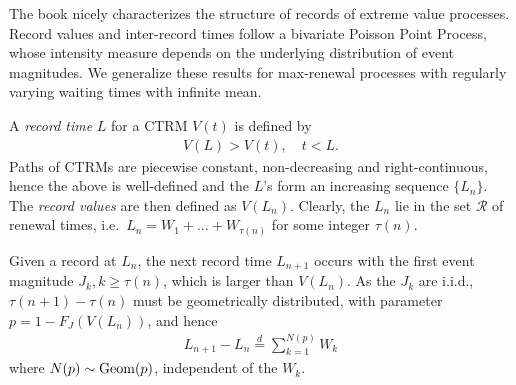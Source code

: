 \documentclass[12pt]{article}
\newcommand{\1}{\mathbf 1}
\begin{document}

The book \cite[Chapter 4]{resnick2013extreme} nicely characterizes the structure of records of extreme value processes. Record values and inter-record times follow a bivariate Poisson Point Process, whose intensity measure depends on the underlying distribution of event magnitudes. We generalize these results for max-renewal processes with regularly varying waiting times with infinite mean. 

A \textit{record time} $L$ for a CTRM $V(t)$ is defined by 
\begin{align*}
V(L) > V(t), \quad t < L.
\end{align*}
Paths of CTRMs are piecewise constant, non-decreasing and right-continuous, hence the above is well-defined and the $L$'s form an increasing sequence $\{L_n\}$. The \textit{record values} are then defined as $V(L_n)$. Clearly, the $L_n$ lie in the set $\mathcal R$ of renewal times, i.e.\ $L_n = W_1 + \ldots + W_{\tau(n)}$ for some integer $\tau(n)$. 

Given a record at $L_n$, the next record time $L_{n+1}$ occurs with the first event magnitude $J_k, k \ge \tau(n)$, which is larger than $V(L_n)$. As the $J_k$ are i.i.d., $\tau(n+1) - \tau(n)$ must be geometrically distributed, with parameter $p = 1 - F_J(V(L_n))$, and hence 
\begin{align} \label{eq:geometric-sum}
L_{n+1} - L_n \stackrel{d}{=} \sum_{k=1}^{N(p)} W_k
\end{align}
where $N(p) \sim {\rm Geom}(p)$, independent of the $W_k$. 
\end{document}
